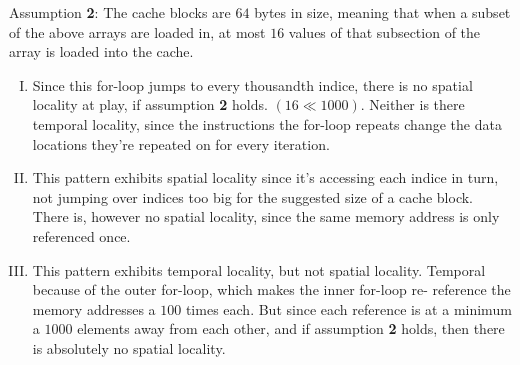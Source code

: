 \documentclass[fontsize=11pt, paper=a4, titlepage]{article}
\begin{document}
\begin{enumerate}[a)]
Assumption \textbf{2}: The cache blocks are $64$ bytes in size, meaning that
when a subset of the above arrays are loaded in, at most $16$ values of that
subsection of the array is loaded into the cache.

    \begin{enumerate}[I)]

        \item Since this for-loop jumps to every thousandth indice, there is no
spatial locality at play, if assumption \textbf{2} holds. $(16 \ll 1000)$.
Neither is there temporal locality, since the instructions the for-loop repeats
change the data locations they're repeated on for every iteration.

        \item This pattern exhibits spatial locality since it's accessing each
indice in turn, not jumping over indices too big for the suggested size of a
cache block. There is, however no spatial locality, since the same memory
address is only referenced once.

        \item This pattern exhibits temporal locality, but not spatial locality.
Temporal because of the outer for-loop, which makes the inner for-loop re-
reference the memory addresses a $100$ times each. But since each reference is
at a minimum a $1000$ elements away from each other, and if assumption
\textbf{2} holds, then there is absolutely no spatial locality.

    \end{enumerate}

\end{enumerate}
\end{document}
